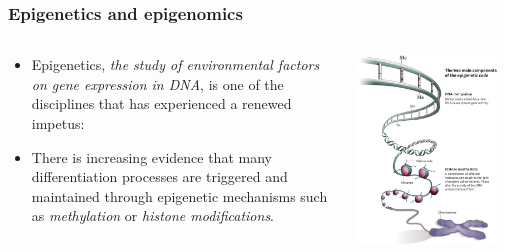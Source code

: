 \documentclass[handout]{beamer}
\begin{document}
\begin{frame}
\frametitle{Epigenetics and epigenomics}
\begin{columns}
\begin{column}{.5\linewidth}
\begin{itemize}
\item Epigenetics, \emph{the study of environmental factors on gene expression in DNA}, is one of the disciplines that has experienced a renewed impetus:
\item There is increasing evidence that many differentiation processes are triggered and maintained through epigenetic mechanisms such as \emph{methylation} or \emph{histone modifications}.
\end{itemize} 
\end{column}
 \begin{column}{.5\linewidth}
\includegraphics[width=0.9\textwidth]{./images/epigeneticsMechanisms.jpg}
 \end{column}
\end{columns}
\end{frame}
\end{document}
